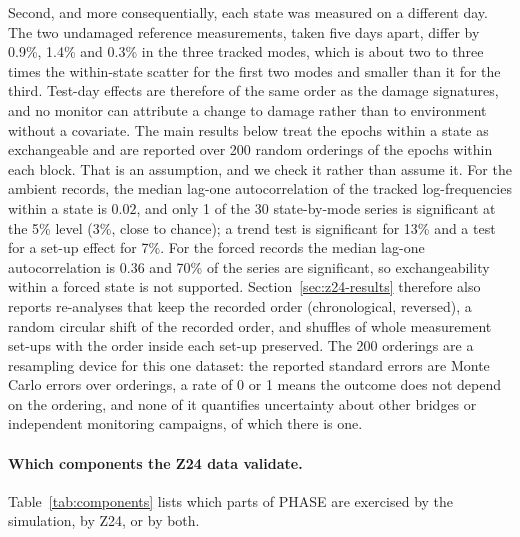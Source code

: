\documentclass[12pt,a4paper]{article}
\newenvironment{revblock}{}{}
\newenvironment{revblock}{\begingroup\color{revcol}}{\endgroup}
\begin{document}
Second, and more consequentially, each state was measured on a different day. The two undamaged reference measurements, taken five days apart, differ by 0.9\%, 1.4\% and 0.3\% in the three tracked modes, which is about two to three times the within-state scatter for the first two modes and smaller than it for the third. Test-day effects are therefore of the same order as the damage signatures, and no monitor can attribute a change to damage rather than to environment without a covariate. \begin{revblock}
The main results below treat the epochs within a state as exchangeable and are reported over 200 random orderings of the epochs within each block. That is an assumption, and we check it rather than assume it. For the ambient records, the median lag-one autocorrelation of the tracked log-frequencies within a state is $0.02$, and only 1 of the 30 state-by-mode series is significant at the 5\% level (3\%, close to chance); a trend test is significant for 13\% and a test for a set-up effect for 7\%. For the forced records the median lag-one autocorrelation is $0.36$ and 70\% of the series are significant, so exchangeability within a forced state is not supported. Section~\ref{sec:z24-results} therefore also reports re-analyses that keep the recorded order (chronological, reversed), a random circular shift of the recorded order, and shuffles of whole measurement set-ups with the order inside each set-up preserved. The 200 orderings are a resampling device for this one dataset: the reported standard errors are Monte Carlo errors over orderings, a rate of 0 or 1 means the outcome does not depend on the ordering, and none of it quantifies uncertainty about other bridges or independent monitoring campaigns, of which there is one.

\paragraph{Which components the Z24 data validate.} Table~\ref{tab:components} lists which parts of PHASE are exercised by the simulation, by Z24, or by both.


\end{revblock}
\end{document}
